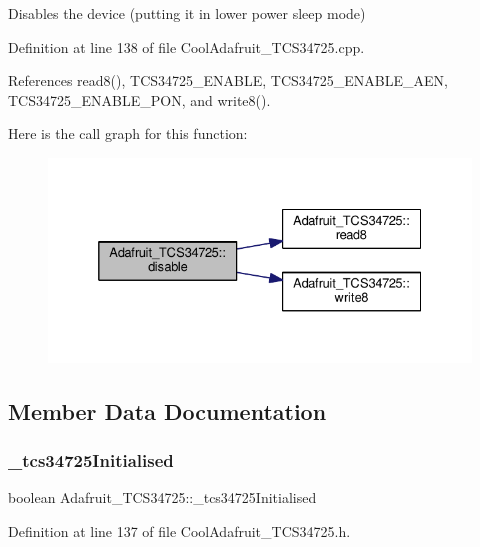 Disables the device (putting it in lower power sleep mode) 

Definition at line 138 of file Cool\+Adafruit\+\_\+\+T\+C\+S34725.\+cpp.



References read8(), T\+C\+S34725\+\_\+\+E\+N\+A\+B\+LE, T\+C\+S34725\+\_\+\+E\+N\+A\+B\+L\+E\+\_\+\+A\+EN, T\+C\+S34725\+\_\+\+E\+N\+A\+B\+L\+E\+\_\+\+P\+ON, and write8().

Here is the call graph for this function\+:\nopagebreak
\begin{figure}[H]
\begin{center}
\leavevmode
\includegraphics[width=332pt]{df/d54/class_adafruit___t_c_s34725_a79ac9b01a540f132d4bbf2edd2d6e8a2_cgraph}
\end{center}
\end{figure}


\subsection{Member Data Documentation}
\mbox{\label{class_adafruit___t_c_s34725_ae9368bc77b501044f034d5d9ad3266ba}} 
\subsubsection{\texorpdfstring{\+\_\+tcs34725\+Initialised}{\_tcs34725Initialised}}
{\footnotesize\ttfamily boolean Adafruit\+\_\+\+T\+C\+S34725\+::\+\_\+tcs34725\+Initialised\hspace{0.3cm}{\ttfamily [private]}}



Definition at line 137 of file Cool\+Adafruit\+\_\+\+T\+C\+S34725.\+h.



